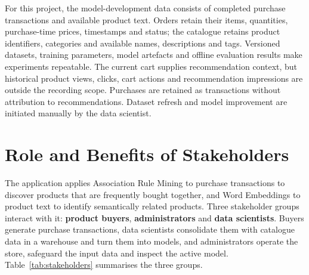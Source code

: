 \documentclass[a4paper,12pt]{article}
\begin{document}
For this project, the model-development data consists of completed purchase transactions and
available product text. Orders retain their items, quantities, purchase-time prices, timestamps and
status; the catalogue retains product identifiers, categories and available names, descriptions and
tags. Versioned datasets, training parameters, model artefacts and offline evaluation results make
experiments repeatable. The current cart supplies recommendation context, but historical product
views, clicks, cart actions and recommendation impressions are outside the recording scope.
Purchases are retained as transactions without attribution to recommendations. Dataset refresh and
model improvement are initiated manually by the data scientist.

\clearpage
\section{Role and Benefits of Stakeholders}
\label{sec:stakeholders}

The application applies Association Rule Mining to purchase transactions to discover products that
are frequently bought together, and Word Embeddings to product text to identify semantically related
products. Three stakeholder groups interact with it: \textbf{product buyers}, \textbf{administrators}
and \textbf{data scientists}. Buyers generate purchase transactions, data scientists consolidate
them with catalogue data in a warehouse and turn them into models, and administrators operate the
store, safeguard the input data and inspect the active model. Table~\ref{tab:stakeholders}
summarises the three groups.
\end{document}
